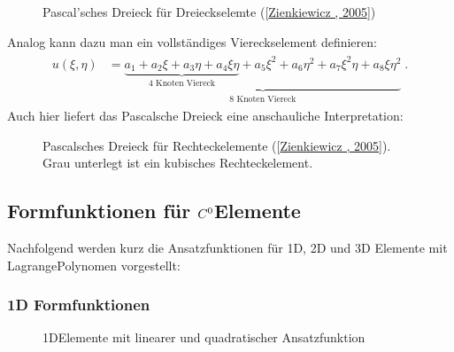 \documentclass[letterpaper,10pt,german]{jupyterBook}
\let\sphinxpxdimen\pdfpxdimen\else\newdimen\sphinxpxdimen
\begin{document}
\begin{figure}[htbp]
\centering
\capstart

\noindent{}
\caption{Pascal’sches Dreieck für Dreieckselemte ({[}\hyperlink{cite.quellen:id3}{Zienkiewicz , 2005}{]})}\label{\detokenize{chapters/chapter3/Ansatzfunktionen:pascaltriangle}}\end{figure}

\sphinxAtStartPar
Analog kann dazu man ein vollständiges Viereckselement definieren:
\begin{equation}\label{equation:chapters/chapter3/Ansatzfunktionen:ansatzfunktionenCompleteQuad}
\begin{split}\begin{align}
u(\xi,\eta) &= \underbrace{\underbrace{ a_1 + a_2 \xi + a_3 \eta + a_4 \xi \eta}_{\text{4 Knoten Viereck}} + a_5 \xi^2 + a_6 \eta^2 + a_7 \xi^2 \eta + a_8 \xi \eta^2}_{\text{8 Knoten Viereck}} \; .
\end{align}\end{split}
\end{equation}
\sphinxAtStartPar
Auch hier liefert das Pascalsche Dreieck eine anschauliche Interpretation:

\begin{figure}[htbp]
\centering
\capstart

\noindent{}
\caption{Pascalsches Dreieck für Rechteckelemente ({[}\hyperlink{cite.quellen:id3}{Zienkiewicz , 2005}{]}). Grau unterlegt ist ein kubisches Rechteckelement.}\label{\detokenize{chapters/chapter3/Ansatzfunktionen:pascalquad}}\end{figure}


\subsection{Formfunktionen für \protect\(C^0\protect\)\sphinxhyphen{}Elemente}
\label{\detokenize{chapters/chapter3/Ansatzfunktionen:formfunktionen-fur-c-0-elemente}}
\sphinxAtStartPar
Nachfolgend werden kurz die Ansatzfunktionen für 1D, 2D und 3D Elemente mit Lagrange\sphinxhyphen{}Polynomen vorgestellt:


\subsubsection{1D Formfunktionen}
\label{\detokenize{chapters/chapter3/Ansatzfunktionen:d-formfunktionen}}
\begin{figure}[htbp]
\centering
\capstart

\noindent\sphinxincludegraphics[width=500\sphinxpxdimen]{{Line-Elements}.png}
\caption{1D\sphinxhyphen{}Elemente mit linearer und quadratischer Ansatzfunktion}\label{\detokenize{chapters/chapter3/Ansatzfunktionen:linearelements}}\end{figure}
\end{document}
